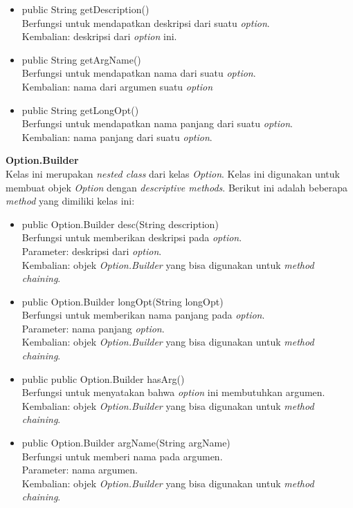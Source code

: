 \documentclass[a4paper,twoside]{article}
\begin{document}
\begin{enumerate}
\begin{itemize}
\item public String getDescription()\\
Berfungsi untuk mendapatkan deskripsi dari suatu \textit{option}.\\
Kembalian: deskripsi dari \textit{option} ini.
\item public String getArgName()\\
Berfungsi untuk mendapatkan nama dari suatu \textit{option}.\\
Kembalian: nama dari argumen suatu \textit{option}
\item public String getLongOpt()\\
Berfungsi untuk mendapatkan nama panjang dari suatu \textit{option}.\\
Kembalian: nama panjang dari suatu \textit{option}.

\end{itemize}

\textbf{Option.Builder}\\
Kelas ini merupakan \textit{nested class} dari kelas \textit{Option}. Kelas ini digunakan untuk membuat objek \textit{Option} dengan \textit{descriptive methods}. Berikut ini adalah beberapa \textit{method} yang dimiliki kelas ini: 
\begin{itemize}
\item public Option.Builder desc(String description)\\
Berfungsi untuk memberikan deskripsi pada \textit{option}.\\
Parameter: deskripsi dari \textit{option}.\\
Kembalian: objek \textit{Option.Builder} yang bisa digunakan untuk \textit{method chaining}.

\item public Option.Builder longOpt(String longOpt)\\
Berfungsi untuk memberikan nama panjang pada \textit{option}.\\
Parameter: nama panjang \textit{option}.\\
Kembalian: objek \textit{Option.Builder} yang bisa digunakan untuk \textit{method chaining}.

\item public public Option.Builder hasArg()\\
Berfungsi untuk menyatakan bahwa \textit{option} ini membutuhkan argumen.\\
Kembalian: objek \textit{Option.Builder} yang bisa digunakan untuk \textit{method chaining}.

\item public Option.Builder argName(String argName)\\
Berfungsi untuk memberi nama pada argumen.\\
Parameter: nama argumen.\\
Kembalian: objek \textit{Option.Builder} yang bisa digunakan untuk \textit{method chaining}.


\end{itemize}
\end{enumerate}
\end{document}
